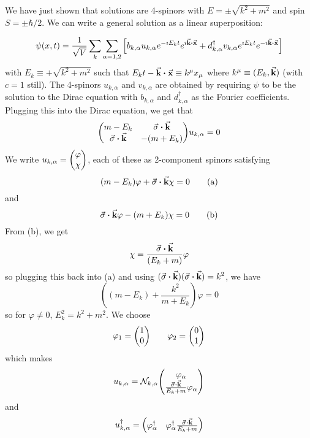 \documentclass[a4paper,twoside,master.tex]{subfiles}
\begin{document}

We have just shown that solutions are 4-spinors with $ E = \pm \sqrt{k^2 + m^2} $ and spin $ S = \pm \hbar / 2 $. We can write a general solution as a linear superposition:

\begin{equation}
    \psi(x, t) = \frac{1}{\sqrt{V}} \sum_k \sum_{\alpha = 1,2} \left[ b_{k, \alpha} u_{k, \alpha} e^{- \imath E_k t} e^{\imath \va{k} \vdot \va{x}} + d^\dagger_{k, \alpha} v_{k, \alpha} e^{\imath E_k t} e^{- \imath \va{k} \vdot \va{x}} \right]
\end{equation}
with $ E_k \equiv + \sqrt{k^2 + m^2} $ such that $ E_k t - \va{k} \vdot \va{x} \equiv k^{\mu} x_{\mu} $ where $ k^{\mu} \equiv (E_k, \va{k}) $ (with $ c = 1 $ still). The 4-spinors $ u_{k, \alpha} $ and $ v_{k, \alpha} $ are obtained by requiring $ \psi $ to be the solution to the Dirac equation with $ b_{k, \alpha} $ and $ d^\dagger_{k, \alpha} $ as the Fourier coefficients. Plugging this into the Dirac equation, we get that
\begin{equation}
    \mqty(m - E_k & \va{\sigma} \vdot \va{k} \\ \va{\sigma} \vdot \va{k} & -(m + E_k))u_{k, \alpha} = 0
\end{equation}
We write $ u_{k, \alpha} = \mqty(\varphi \\ \chi) $, each of these as 2-component spinors satisfying
\begin{equation}
    (m - E_k) \varphi + \va{\sigma} \vdot \va{k} \chi = 0 \tag{a}
\end{equation}
and
\begin{equation}
    \va{\sigma} \vdot \va{k} \varphi - (m + E_k) \chi = 0 \tag{b}
\end{equation}
From (b), we get
\begin{equation}
    \chi = \frac{\va{\sigma} \vdot \va{k}}{(E_k + m)} \varphi
\end{equation}
so plugging this back into (a) and using $ (\va{\sigma} \vdot \va{k})(\va{\sigma} \vdot \va{k}) = k^2 $, we have
\begin{equation}
    \left( (m - E_k) + \frac{k^2}{m + E_k} \right) \varphi = 0
\end{equation}
so for $ \varphi \neq 0 $, $ E_k^2 = k^2 + m^2 $. We choose
\begin{equation}
    \varphi_1 = \mqty(1\\0) \qquad \varphi_2 = \mqty(0\\1)
\end{equation}
which makes
\begin{equation}
    u_{k, \alpha} = \mathcal{N}_{k, \alpha} \mqty(\varphi_{\alpha} \\ \frac{\va{\sigma} \vdot \va{k}}{E_k + m} \varphi_{\alpha})
\end{equation}
and
\begin{equation}
    u^\dagger_{k, \alpha} = \mqty(\varphi_{\alpha}^\dagger & \varphi_{\alpha}^\dagger \frac{\va{\sigma} \vdot \va{k}}{E_k + m})
\end{equation}
\end{document}
